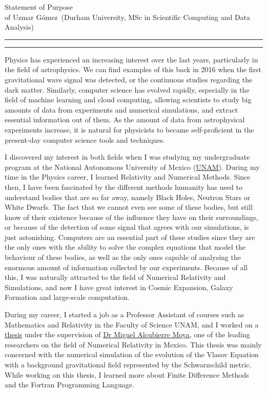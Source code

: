 \documentclass{article}
\newcommand{\soptitle}{Statement of Purpose}
\newcommand{\yourname}{Uzmar G\'omez}
\begin{document}
\begin{center}\LARGE\soptitle\\
\large of \yourname\ (Durham University, MSc in Scientific Computing and Data Analysis)
\end{center}

\hrule
\vspace{1pt}
\hrule height 1pt

\bigskip

Physics has experienced an increasing interest over the last years, particularly in the field of astrophysics. We can find examples of this back in 2016 when the first gravitational wave signal was detected, or the continuous studies regarding the dark matter. Similarly, computer science has evolved rapidly, especially in the field of machine learning and cloud computing, allowing scientists to study big amounts of data from experiments and numerical simulations, and extract essential information out of them. As the amount of data from astrophysical experiments increase, it is natural for physicists to became self-proficient in the present-day computer science tools and techniques.

I discovered my interest in both fields when I was studying my undergraduate program at the National Autonomous University of Mexico (\href{https://www.unam.mx/}{UNAM}). During my time in the Physics career, I learned Relativity and Numerical Methods. Since then, I have been fascinated by the different methods humanity has used to understand bodies that are so far away, namely Black Holes, Neutron Stars or White Dwarfs. The fact that we cannot even see some of these bodies, but still know of their existence because of the influence they have on their surroundings, or because of the detection of some signal that agrees with our simulations, is just astonishing. Computers are an essential part of these studies since they are the only ones with the ability to solve the complex equations that model the behaviour of these bodies, as well as the only ones capable of analysing the enormous amount of information collected by our experiments. Because of all this, I was naturally attracted to the field of Numerical Relativity and Simulations, and now I have great interest in Cosmic Expansion, Galaxy Formation and large-scale computation.

During my career, I started a job as a Professor Assistant of courses such as Mathematics and Relativity in the Faculty of Science UNAM, and I worked on a \href{http://oreon.dgbiblio.unam.mx/F/YF3LAD8UIUFR2XRPDE3H6JM2MI44M8RY8QX1RH7K429163KKEV-19694?func=find-b&request=uzmar&find_code=WRD&adjacent=N&local_base=TES01&x=65&y=13&filter_code_2=WYR&filter_request_2=&filter_code_3=WYR&filter_request_3=}{thesis} under the supervision of  \href{https://sigi.nucleares.unam.mx/sgiicn/people/user/view/id/8}{Dr Miguel Alcubierre Moya}, one of the leading researchers on the field of Numerical Relativity in Mexico. This thesis was mainly concerned with the numerical simulation of the evolution of the Vlasov Equation with a background gravitational field represented by the Schwarzschild metric. While working on this thesis, I learned more about Finite Difference Methods and the Fortran Programming Language. 
\end{document}
